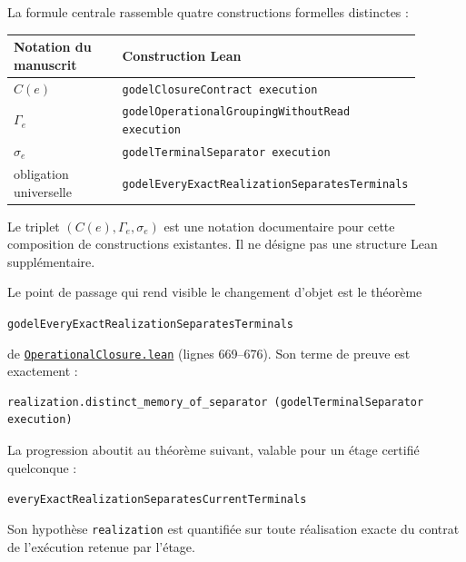 \documentclass[11pt,a4paper]{article}
\newcommand{\code}[1]{\nolinkurl{#1}}
\newcommand{\SourceAt}[3]{\href{https://github.com/JohnDoe-collab-stack/relational-perimeter/blob/1e5aeda745559d62a3819bb3213da7fce3c31ad1/#1\#L#2}{\nolinkurl{#3}}}
\theoremstyle{remark}
\begin{document}
La formule centrale rassemble quatre constructions formelles distinctes :
\begin{center}
\renewcommand{\arraystretch}{1.2}
\begin{tabular}{>{\raggedright\arraybackslash}p{0.28\linewidth}
                >{\raggedright\arraybackslash}p{0.61\linewidth}}
\toprule
\textbf{Notation du manuscrit} & \textbf{Construction Lean} \\
\midrule
$C(e)$ & \code{godelClosureContract execution} \\
$\Gamma_e$ & \code{godelOperationalGroupingWithoutRead execution} \\
$\sigma_e$ & \code{godelTerminalSeparator execution} \\
obligation universelle & \code{godelEveryExactRealizationSeparatesTerminals} \\
\bottomrule
\end{tabular}
\end{center}

Le triplet $(C(e),\Gamma_e,\sigma_e)$ est une notation documentaire pour
cette composition de constructions existantes. Il ne désigne pas une
structure Lean supplémentaire.

Le point de passage qui rend visible le changement d'objet est le théorème
\begin{center}
\code{godelEveryExactRealizationSeparatesTerminals}
\end{center}
de
\SourceAt{RelationalPerimeter/Constitution/Godel/OperationalClosure.lean}{669-L676}{OperationalClosure.lean}
(lignes 669--676). Son terme de preuve est exactement :
\begin{Verbatim}[fontsize=\small]
realization.distinct_memory_of_separator (godelTerminalSeparator execution)
\end{Verbatim}
La progression aboutit au théorème suivant, valable pour un étage certifié
quelconque :
\begin{center}
\code{everyExactRealizationSeparatesCurrentTerminals}
\end{center}
Son hypothèse \code{realization} est quantifiée sur toute réalisation exacte
du contrat de l'exécution retenue par l'étage.
\end{document}
